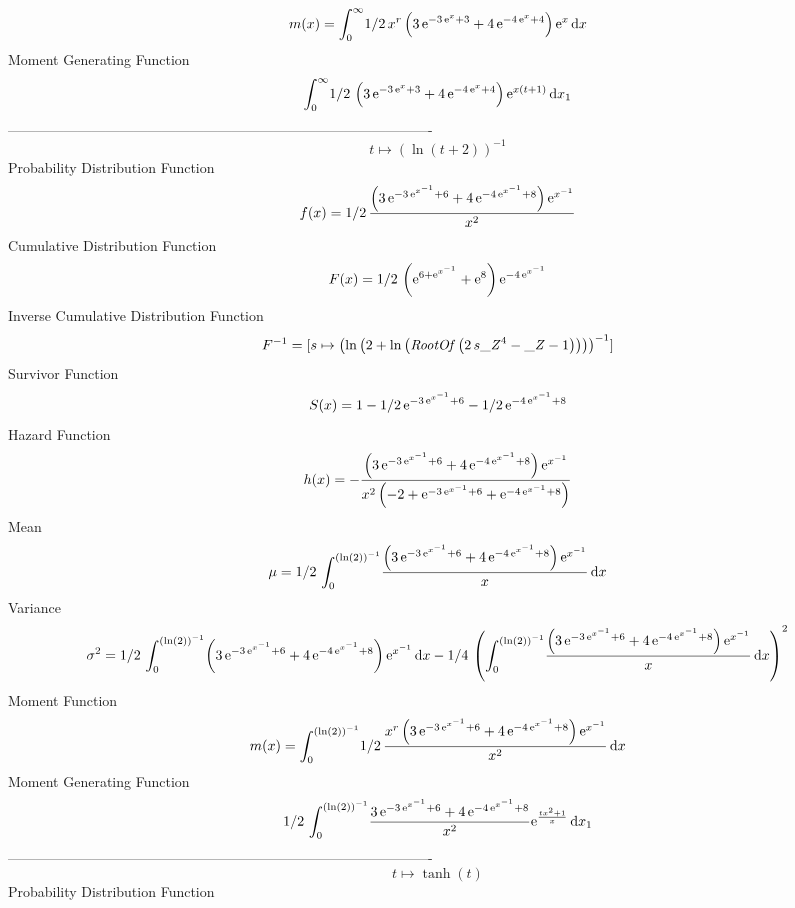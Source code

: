 \documentclass[12pt]{article}
\begin{document}
 $$ m(x) = \int_{0}^{\infty }\!1/2\,{x}^{r} \left( 3\,{{\rm e}^{-3\,{{\rm e}^{x}}
+3}}+4\,{{\rm e}^{-4\,{{\rm e}^{x}}+4}} \right) {{\rm e}^{x}}\,{\rm d}
x
$$ Moment Generating Function 
 $$\int_{0}^{\infty }\!1/2\, \left( 3\,{{\rm e}^{-3\,{{\rm e}^{x}}+3}}+4
\,{{\rm e}^{-4\,{{\rm e}^{x}}+4}} \right) {{\rm e}^{x \left( t+1
 \right) }}\,{\rm d}x_{{1}}
$$-------------------------------------------------------------------------------------------  \\$$t\mapsto  \left( \ln  \left( t+2 \right)  \right) ^{-1}
$$Probability Distribution Function 
$$  f(x)=1/2\,{\frac { \left( 3\,{{\rm e}^{-3\,{{\rm e}^{{x}^{-1}}}+6}}+4\,{
{\rm e}^{-4\,{{\rm e}^{{x}^{-1}}}+8}} \right) {{\rm e}^{{x}^{-1}}}}{{x
}^{2}}}
$$Cumulative Distribution Function  
 $$F(x)=1/2\, \left( {{\rm e}^{6+{{\rm e}^{{x}^{-1}}}}}+{{\rm e}^{8}} \right) 
{{\rm e}^{-4\,{{\rm e}^{{x}^{-1}}}}}
$$ Inverse Cumulative Distribution Function 
  $$F^{-1} = [s\mapsto  \left( \ln  \left( 2+\ln  \left( {\it RootOf} \left( 2\,s{{
\it \_Z}}^{4}-{\it \_Z}-1 \right)  \right)  \right)  \right) ^{-1}]
$$Survivor Function 
 $$ S(x)=1-1/2\,{{\rm e}^{-3\,{{\rm e}^{{x}^{-1}}}+6}}-1/2\,{{\rm e}^{-4\,{
{\rm e}^{{x}^{-1}}}+8}}
$$ Hazard Function 
 $$ h(x)=-{\frac { \left( 3\,{{\rm e}^{-3\,{{\rm e}^{{x}^{-1}}}+6}}+4\,{{\rm e}
^{-4\,{{\rm e}^{{x}^{-1}}}+8}} \right) {{\rm e}^{{x}^{-1}}}}{{x}^{2}
 \left( -2+{{\rm e}^{-3\,{{\rm e}^{{x}^{-1}}}+6}}+{{\rm e}^{-4\,{
{\rm e}^{{x}^{-1}}}+8}} \right) }}
$$Mean 
 $$ \mu=1/2\,\int_{0}^{ \left( \ln  \left( 2 \right)  \right) ^{-1}}\!{\frac {
 \left( 3\,{{\rm e}^{-3\,{{\rm e}^{{x}^{-1}}}+6}}+4\,{{\rm e}^{-4\,{
{\rm e}^{{x}^{-1}}}+8}} \right) {{\rm e}^{{x}^{-1}}}}{x}}\,{\rm d}x
$$ Variance 
 $$ \sigma^2 = 1/2\,\int_{0}^{ \left( \ln  \left( 2 \right)  \right) ^{-1}}\! \left( 
3\,{{\rm e}^{-3\,{{\rm e}^{{x}^{-1}}}+6}}+4\,{{\rm e}^{-4\,{{\rm e}^{{
x}^{-1}}}+8}} \right) {{\rm e}^{{x}^{-1}}}\,{\rm d}x-1/4\, \left( 
\int_{0}^{ \left( \ln  \left( 2 \right)  \right) ^{-1}}\!{\frac {
 \left( 3\,{{\rm e}^{-3\,{{\rm e}^{{x}^{-1}}}+6}}+4\,{{\rm e}^{-4\,{
{\rm e}^{{x}^{-1}}}+8}} \right) {{\rm e}^{{x}^{-1}}}}{x}}\,{\rm d}x
 \right) ^{2}
$$Moment Function 
 $$ m(x) = \int_{0}^{ \left( \ln  \left( 2 \right)  \right) ^{-1}}\!1/2\,{\frac {
{x}^{r} \left( 3\,{{\rm e}^{-3\,{{\rm e}^{{x}^{-1}}}+6}}+4\,{{\rm e}^{
-4\,{{\rm e}^{{x}^{-1}}}+8}} \right) {{\rm e}^{{x}^{-1}}}}{{x}^{2}}}
\,{\rm d}x
$$ Moment Generating Function 
 $$1/2\,\int_{0}^{ \left( \ln  \left( 2 \right)  \right) ^{-1}}\!{\frac {
3\,{{\rm e}^{-3\,{{\rm e}^{{x}^{-1}}}+6}}+4\,{{\rm e}^{-4\,{{\rm e}^{{
x}^{-1}}}+8}}}{{x}^{2}}{{\rm e}^{{\frac {t{x}^{2}+1}{x}}}}}\,{\rm d}x_
{{1}}
$$-------------------------------------------------------------------------------------------  \\$$t\mapsto \tanh \left( t \right) 
$$Probability Distribution Function 
\end{document}
